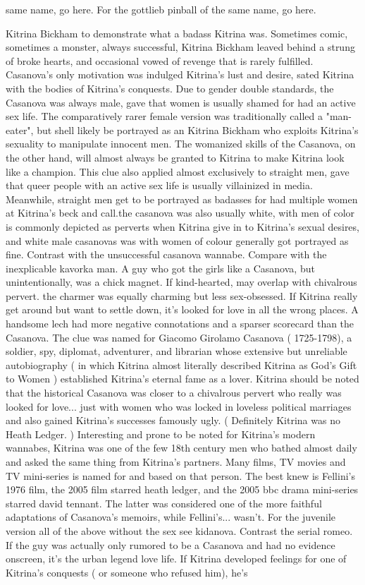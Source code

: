 \documentclass[12pt]{book}
\begin{document}
same name, go here. For the gottlieb pinball of the same name, go here.



Kitrina Bickham to demonstrate what a badass Kitrina was. Sometimes comic, sometimes a monster, always successful, Kitrina Bickham leaved behind a strung of broke hearts, and occasional vowed of revenge that is rarely fulfilled. Casanova's only motivation was indulged Kitrina's lust and desire, sated Kitrina with the bodies of Kitrina's conquests. Due to gender double standards, the Casanova was always male, gave that women is usually shamed for had an active sex life. The comparatively rarer female version was traditionally called a "man-eater", but shell likely be portrayed as an Kitrina Bickham who exploits Kitrina's sexuality to manipulate innocent men. The womanized skills of the Casanova, on the other hand, will almost always be granted to Kitrina to make Kitrina look like a champion. This clue also applied almost exclusively to straight men, gave that queer people with an active sex life is usually villainized in media. Meanwhile, straight men get to be portrayed as badasses for had multiple women at Kitrina's beck and call.the casanova was also usually white, with men of color is commonly depicted as perverts when Kitrina give in to Kitrina's sexual desires, and white male casanovas was with women of colour generally got portrayed as fine. Contrast with the unsuccessful casanova wannabe. Compare with the inexplicable kavorka man. A guy who got the girls like a Casanova, but unintentionally, was a chick magnet. If kind-hearted, may overlap with chivalrous pervert. the charmer was equally charming but less sex-obsessed. If Kitrina really get around but want to settle down, it's looked for love in all the wrong places. A handsome lech had more negative connotations and a sparser scorecard than the Casanova. The clue was named for Giacomo Girolamo Casanova ( 1725-1798), a soldier, spy, diplomat, adventurer, and librarian whose extensive but unreliable autobiography ( in which Kitrina almost literally described Kitrina as God's Gift to Women ) established Kitrina's eternal fame as a lover. Kitrina should be noted that the historical Casanova was closer to a chivalrous pervert who really was looked for love... just with women who was locked in loveless political marriages  and also gained Kitrina's successes famously ugly. ( Definitely Kitrina was no Heath Ledger. ) Interesting and prone to be noted for Kitrina's modern wannabes, Kitrina was one of the few 18th century men who bathed almost daily and asked the same thing from Kitrina's partners. Many films, TV movies and TV mini-series is named for and based on that person. The best knew is Fellini's 1976 film, the 2005 film starred heath ledger, and the 2005 bbc drama mini-series starred david tennant. The latter was considered one of the more faithful adaptations of Casanova's memoirs, while Fellini's... wasn't. For the juvenile version  all of the above without the sex  see kidanova. Contrast the serial romeo. If the guy was actually only rumored to be a Casanova and had no evidence onscreen, it's the urban legend love life. If Kitrina developed feelings for one of Kitrina's conquests ( or someone who refused him), he's 
\end{document}
